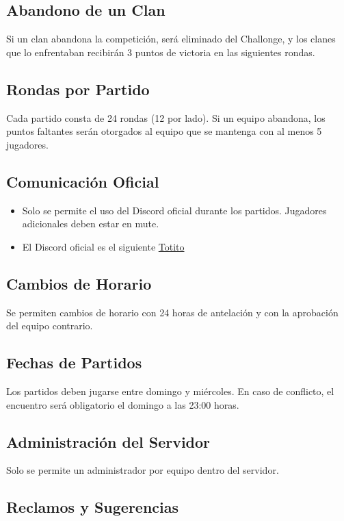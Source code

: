 \documentclass[a4paper, 11pt]{article}
\begin{document}
    \subsection{Abandono de un Clan}
    Si un clan abandona la competición, será eliminado del Challonge, y los clanes que lo enfrentaban recibirán 3 puntos de victoria en las siguientes rondas.

    \subsection{Rondas por Partido}
    Cada partido consta de 24 rondas (12 por lado). Si un equipo abandona, los puntos faltantes serán otorgados al equipo que se mantenga con al menos 5 jugadores.

    \subsection{Comunicación Oficial}
    \begin{itemize}
        \item Solo se permite el uso del Discord oficial durante los partidos. Jugadores adicionales deben estar en mute.
        \item El Discord oficial es el siguiente \hyperlink{https://discord.gg/ajQxVbh8}{Totito}
    \end{itemize}

    \subsection{Cambios de Horario}
    Se permiten cambios de horario con 24 horas de antelación y con la aprobación del equipo contrario.

    \subsection{Fechas de Partidos}
    Los partidos deben jugarse entre domingo y miércoles. En caso de conflicto, el encuentro será obligatorio el domingo a las 23:00 horas.

    \subsection{Administración del Servidor}
    Solo se permite un administrador por equipo dentro del servidor.

    \subsection{Reclamos y Sugerencias}
\end{document}
